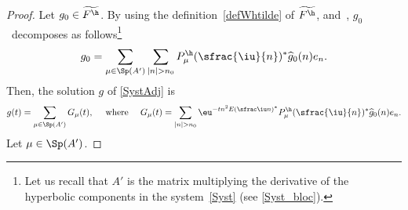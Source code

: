 \begin{proof}
Let $g_0\in \widetilde{F^{\h}}$. By using the definition~\eqref{defWhtilde} of $\widetilde{F^\h}$, and~, $g_0$~decom\-poses as follows\footnote{Let us recall that $A'$ is the matrix multiplying the derivative of the hyperbolic components in the system~\eqref{Syst} (see \eqref{Syst_bloc}).}
\begin{equation}
\label{DecompVarphiThyp}
g_0 = \sum_{\mu\in\Sp(A')}\sum_{|n| > n_0} {P_\mu^\h}(\sfrac{\iu}{n})^* \widehat{g}_0(n) e_n.
\end{equation}
Then, the solution $g$ of \eqref{SystAdj} is
\begin{equation}
\label{DecompVarphiTHypJ}
g(t) = \sum_{\mu \in \Sp(A')} G_\mu(t),
\quad \text{ where } \quad
G_\mu(t) = \sum_{|n| > n_0} \eu^{-t n^2 {E}\left(\sfrac \iu n\right)^*}P_\mu^\h(\sfrac{\iu}{n})^* \widehat{g}_0(n) e_n.
\end{equation}
Let $\mu\in\Sp(A')$.


\end{proof}
